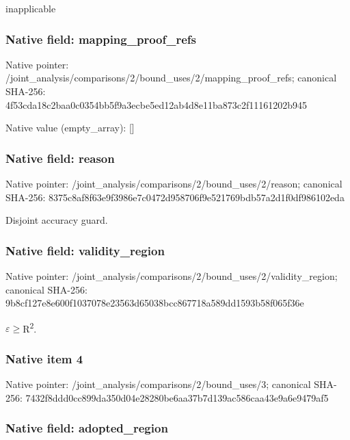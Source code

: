 \documentclass[10pt,a4paper]{article}
\begin{document}
inapplicable


\subsubsection{Native field: mapping\_proof\_refs}


Native pointer: /joint\_analysis/comparis\allowbreak{}ons/2/bound\_uses/2/mappi\allowbreak{}ng\_proof\_refs; canonical SHA-256: 4f53cda18c2baa0c0354bb5f\allowbreak{}9a3ecbe5ed12ab4d8e11ba87\allowbreak{}3c2f11161202b945



Native value (empty\_array): []



\subsubsection{Native field: reason}


Native pointer: /joint\_analysis/comparis\allowbreak{}ons/2/bound\_uses/2/reaso\allowbreak{}n; canonical SHA-256: 8375c8af8f63e9f3986e7c04\allowbreak{}72d958706f9e521769bdb57a\allowbreak{}2d1f0df986102eda


Disjoint accuracy guard.


\subsubsection{Native field: validity\_region}


Native pointer: /joint\_analysis/comparis\allowbreak{}ons/2/bound\_uses/2/valid\allowbreak{}ity\_region; canonical SHA-256: 9b8cf127e8e600f1037078e2\allowbreak{}3563d65038bcc867718a589d\allowbreak{}d1593b58f065f36e


\ensuremath{\varepsilon}\ensuremath{\ge}R\textsuperscript{2}.


\subsubsection{Native item 4}


Native pointer: /joint\_analysis/comparis\allowbreak{}ons/2/bound\_uses/3; canonical SHA-256: 7432f8ddd0cc899da350d04e\allowbreak{}28280be6aa37b7d139ac586c\allowbreak{}aa43e9a6e9479af5



\subsubsection{Native field: adopted\_region}
\end{document}
